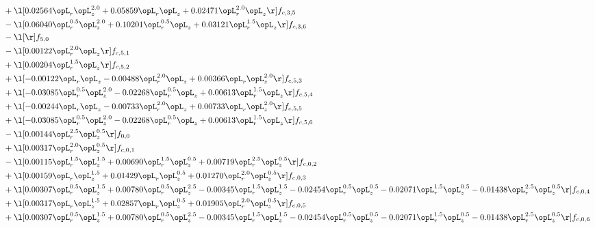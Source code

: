 \begin{alignat}{2}
& + \l[  0.02564 \opL_r \opL_z^{2.0} +  0.05859 \opL_r \opL_z +  0.02471 \opL_r^{2.0} \opL_z  \r] f_{c,3,5} \nonumber \\ 
& - \l[  0.06040 \opL_r^{0.5} \opL_z^{2.0} +  0.10201 \opL_r^{0.5} \opL_z +  0.03121 \opL_r^{1.5} \opL_z  \r] f_{c,3,6} \nonumber \\ 
& - \l[  \r] f_{5,0} \nonumber \\ 
& - \l[  0.00122 \opL_r^{2.0} \opL_z  \r] f_{c,5,1} \nonumber \\ 
& + \l[  0.00204 \opL_r^{1.5} \opL_z  \r] f_{c,5,2} \nonumber \\ 
& + \l[  -0.00122 \opL_r \opL_z   -0.00488 \opL_r^{2.0} \opL_z +  0.00366 \opL_r \opL_z^{2.0}  \r] f_{c,5,3} \nonumber \\ 
& + \l[  -0.03085 \opL_r^{0.5} \opL_z^{2.0}   -0.02268 \opL_r^{0.5} \opL_z +  0.00613 \opL_r^{1.5} \opL_z  \r] f_{c,5,4} \nonumber \\ 
& + \l[  -0.00244 \opL_r \opL_z   -0.00733 \opL_r^{2.0} \opL_z +  0.00733 \opL_r \opL_z^{2.0}  \r] f_{c,5,5} \nonumber \\ 
& + \l[  -0.03085 \opL_r^{0.5} \opL_z^{2.0}   -0.02268 \opL_r^{0.5} \opL_z +  0.00613 \opL_r^{1.5} \opL_z  \r] f_{c,5,6} \nonumber \\ 
& - \l[  0.00144 \opL_r^{2.5} \opL_z^{0.5}  \r] f_{0,0} \nonumber \\ 
& + \l[  0.00317 \opL_r^{2.0} \opL_z^{0.5}  \r] f_{c,0,1} \nonumber \\ 
& - \l[  0.00115 \opL_r^{1.5} \opL_z^{1.5} +  0.00690 \opL_r^{1.5} \opL_z^{0.5} +  0.00719 \opL_r^{2.5} \opL_z^{0.5}  \r] f_{c,0,2} \nonumber \\ 
& + \l[  0.00159 \opL_r \opL_z^{1.5} +  0.01429 \opL_r \opL_z^{0.5} +  0.01270 \opL_r^{2.0} \opL_z^{0.5}  \r] f_{c,0,3} \nonumber \\ 
& + \l[  0.00307 \opL_r^{0.5} \opL_z^{1.5} +  0.00780 \opL_r^{0.5} \opL_z^{2.5}   -0.00345 \opL_r^{1.5} \opL_z^{1.5}   -0.02454 \opL_r^{0.5} \opL_z^{0.5}   -0.02071 \opL_r^{1.5} \opL_z^{0.5}   -0.01438 \opL_r^{2.5} \opL_z^{0.5}  \r] f_{c,0,4} \nonumber \\ 
& + \l[  0.00317 \opL_r \opL_z^{1.5} +  0.02857 \opL_r \opL_z^{0.5} +  0.01905 \opL_r^{2.0} \opL_z^{0.5}  \r] f_{c,0,5} \nonumber \\ 
& + \l[  0.00307 \opL_r^{0.5} \opL_z^{1.5} +  0.00780 \opL_r^{0.5} \opL_z^{2.5}   -0.00345 \opL_r^{1.5} \opL_z^{1.5}   -0.02454 \opL_r^{0.5} \opL_z^{0.5}   -0.02071 \opL_r^{1.5} \opL_z^{0.5}   -0.01438 \opL_r^{2.5} \opL_z^{0.5}  \r] f_{c,0,6} \nonumber \\ 

\end{alignat}
